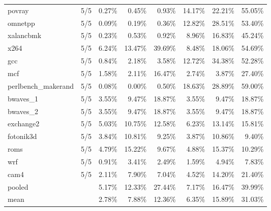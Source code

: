 \documentclass[10pt,a4paper,landscape]{article}
\begin{document}
{\begin{longtable}{lcrrrrrr}
povray & 5/5 & 0.27\% & 0.45\% & 0.93\% & 14.17\% & 22.21\% & 55.05\% \\
omnetpp & 5/5 & 0.09\% & 0.19\% & 0.36\% & 12.82\% & 28.51\% & 53.40\% \\
xalancbmk & 5/5 & 0.23\% & 0.53\% & 0.92\% & 8.96\% & 16.83\% & 45.24\% \\
x264 & 5/5 & 6.24\% & 13.47\% & 39.69\% & 8.48\% & 18.06\% & 54.69\% \\
gcc & 5/5 & 0.84\% & 2.18\% & 3.58\% & 12.72\% & 34.38\% & 52.28\% \\
mcf & 5/5 & 1.58\% & 2.11\% & 16.47\% & 2.74\% & 3.87\% & 27.40\% \\
perlbench\_makerand & 5/5 & 0.08\% & 0.00\% & 0.50\% & 18.63\% & 28.89\% & 59.00\% \\
bwaves\_1 & 5/5 & 3.55\% & 9.47\% & 18.87\% & 3.55\% & 9.47\% & 18.87\% \\
bwaves\_2 & 5/5 & 3.55\% & 9.47\% & 18.87\% & 3.55\% & 9.47\% & 18.87\% \\
exchange2 & 5/5 & 5.03\% & 10.75\% & 12.58\% & 6.23\% & 13.14\% & 15.81\% \\
fotonik3d & 5/5 & 3.84\% & 10.81\% & 9.25\% & 3.87\% & 10.86\% & 9.40\% \\
roms & 5/5 & 4.79\% & 15.22\% & 9.67\% & 4.88\% & 15.37\% & 10.29\% \\
wrf & 5/5 & 0.91\% & 3.41\% & 2.49\% & 1.59\% & 4.94\% & 7.83\% \\
cam4 & 5/5 & 2.11\% & 7.90\% & 7.04\% & 4.52\% & 14.20\% & 21.40\% \\
\midrule
pooled &  & 5.17\% & 12.33\% & 27.44\% & 7.17\% & 16.47\% & 39.99\% \\
mean &  & 2.78\% & 7.88\% & 12.36\% & 6.35\% & 15.89\% & 31.03\% \\
\end{longtable}
}
\clearpage
\end{document}
